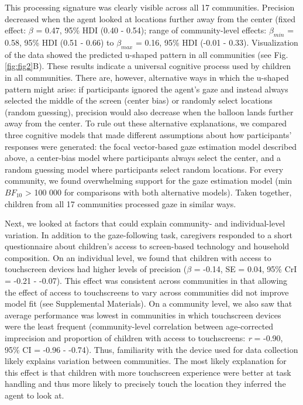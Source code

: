 \documentclass[
  man,floatsintext]{apa6}
\begin{document}
This processing signature was clearly visible across all 17 communities. Precision decreased when the agent looked at locations further away from the center (fixed effect: \(\beta\) = 0.47, 95\% HDI (0.40 - 0.54); range of community-level effects: \(\beta_{min}\) = 0.58, 95\% HDI (0.51 - 0.66) to \(\beta_{max}\) = 0.16, 95\% HDI (-0.01 - 0.33). Visualization of the data showed the predicted u-shaped pattern in all communities (see Fig. \ref{fig:fig2}B). These results indicate a universal cognitive process used by children in all communities. There are, however, alternative ways in which the u-shaped pattern might arise: if participants ignored the agent's gaze and instead always selected the middle of the screen (center bias) or randomly select locations (random guessing), precision would also decrease when the balloon lands further away from the center. To rule out these alternative explanations, we compared three cognitive models that made different assumptions about how participants' responses were generated: the focal vector-based gaze estimation model described above, a center-bias model where participants always select the center, and a random guessing model where participants select random locations. For every community, we found overwhelming support for the gaze estimation model (min \(BF_{10}\) \textgreater{} 100 000 for comparisons with both alternative models). Taken together, children from all 17 communities processed gaze in similar ways.

Next, we looked at factors that could explain community- and individual-level variation. In addition to the gaze-following task, caregivers responded to a short questionnaire about children's access to screen-based technology and household composition. On an individual level, we found that children with access to touchscreen devices had higher levels of precision (\(\beta\) = -0.14, SE = 0.04, 95\% CrI = -0.21 - -0.07). This effect was consistent across communities in that allowing the effect of access to touchscreens to vary across communities did not improve model fit (see Supplemental Materials). On a community level, we also saw that average performance was lowest in communities in which touchscreen devices were the least frequent (community-level correlation between age-corrected imprecision and proportion of children with access to touchscreens: \emph{r} = -0.90, 95\% CI = -0.96 - -0.74). Thus, familiarity with the device used for data collection likely explains variation between communities. The most likely explanation for this effect is that children with more touchscreen experience were better at task handling and thus more likely to precisely touch the location they inferred the agent to look at.
\end{document}
